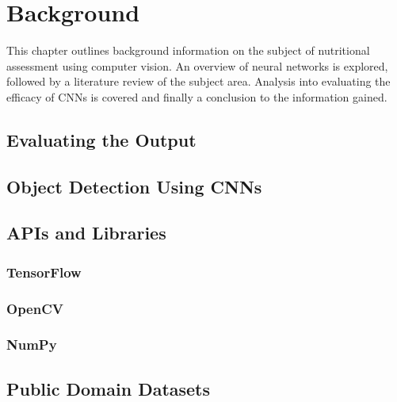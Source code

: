 \chapter{Background}
\label{background}

This chapter outlines background information on the subject of nutritional assessment using computer vision.
An overview of neural networks is explored, followed by a literature review of the subject area.
Analysis into evaluating the efficacy of CNNs is covered and finally a conclusion to the information gained.











\section{Evaluating the Output}




\section{Object Detection Using CNNs}


\section{APIs and Libraries}
\subsection*{TensorFlow}


\subsection*{OpenCV}


\subsection*{NumPy}


\section{Public Domain Datasets}


